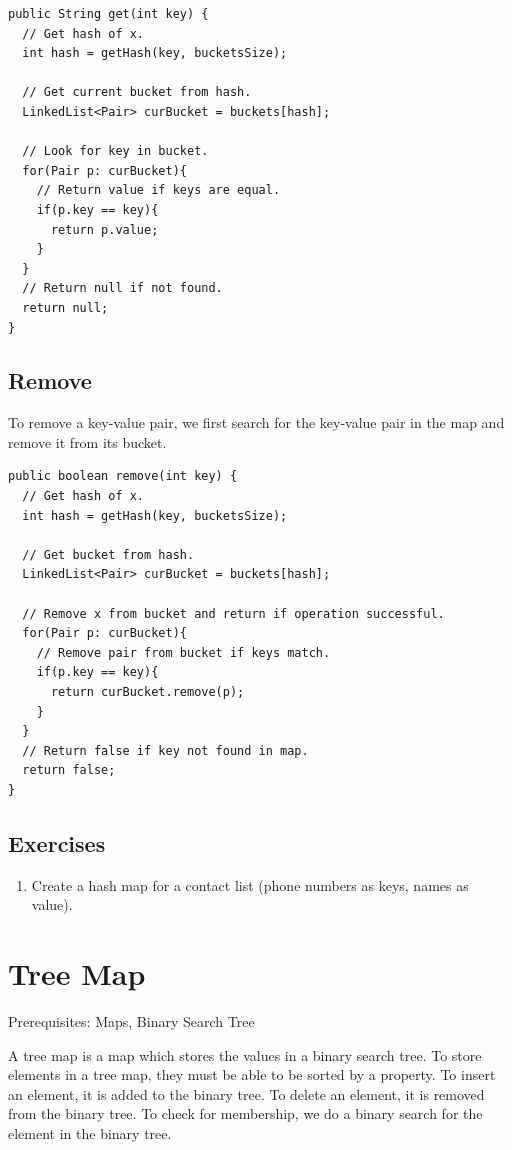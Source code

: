 \documentclass[11pt,oneside]{book}
\begin{document}
\begin{lstlisting}
public String get(int key) {
  // Get hash of x.
  int hash = getHash(key, bucketsSize);
  
  // Get current bucket from hash.
  LinkedList<Pair> curBucket = buckets[hash];
  
  // Look for key in bucket.
  for(Pair p: curBucket){
    // Return value if keys are equal.
    if(p.key == key){
      return p.value;
    }
  }
  // Return null if not found.
  return null;
}
\end{lstlisting}

\subsection{Remove}

To remove a key-value pair, we first search for the key-value pair in the map and remove it from its bucket.

\begin{lstlisting}
public boolean remove(int key) {
  // Get hash of x.
  int hash = getHash(key, bucketsSize);
  
  // Get bucket from hash.
  LinkedList<Pair> curBucket = buckets[hash];
  
  // Remove x from bucket and return if operation successful.
  for(Pair p: curBucket){
    // Remove pair from bucket if keys match.
    if(p.key == key){
      return curBucket.remove(p);
    }
  }
  // Return false if key not found in map.
  return false;
}
\end{lstlisting}

\subsection{Exercises}

\begin{enumerate}
\item Create a hash map for a contact list (phone numbers as keys, names as value).
\end{enumerate}

        \section{ Tree Map }
        

Prerequisites: Maps, Binary Search Tree

A tree map is a map which stores the values in a binary search tree. To store elements in a tree map, they must be able to be sorted by a property. To insert an element, it is added to the binary tree. To delete an element, it is removed from the binary tree. To check for membership, we do a binary search for the element in the binary tree.
\end{document}
